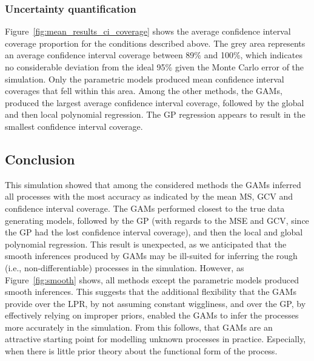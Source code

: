 \documentclass[man, floatsintext]{apa7}
\begin{document}
\subsubsection{Uncertainty quantification}

Figure~\ref{fig:mean_results_ci_coverage} shows the average confidence interval
coverage proportion for the conditions described above. The grey area
represents an average confidence interval coverage between 89\% and 100\%,
which indicates no considerable deviation from the ideal 95\% given the Monte
Carlo error of the simulation. Only the parametric models produced mean
confidence interval coverages that fell within this area. Among the other
methods, the GAMs, produced the largest average confidence interval coverage,
followed by the global and then local polynomial regression. The GP regression
appears to result in the smallest confidence interval coverage.

\begin{sidewaysfigure*}[htbp]
  \caption{Average confidence interval coverage across all processes, analysis
    methods, and simulation conditions}
  \label{fig:mean_results_ci_coverage}
\end{sidewaysfigure*}

\subsection{Conclusion}

This simulation showed that among the considered methods the GAMs inferred all
processes with the most accuracy as indicated by the mean MS, GCV and
confidence interval coverage. The GAMs performed closest to the true data
generating models, followed by the GP (with regards to the MSE and GCV, since
the GP had the lost confidence interval coverage), and then the local and
global polynomial regression. This result is unexpected, as we anticipated that
the smooth inferences produced by GAMs may be ill-suited for inferring the
rough (i.e., non-differentiable) processes in the simulation. However, as
Figure~\ref{fig:smooth} shows, all methods except the parametric models
produced smooth inferences. This suggests that the additional flexibility that
the GAMs provide over the LPR, by not assuming constant wiggliness, and over
the GP, by effectively relying on improper priors, enabled the GAMs to infer
the processes more accurately in the simulation. From this follows, that GAMs
are an attractive starting point for modelling unknown processes in practice.
Especially, when there is little prior theory about the functional form of the
process.
\end{document}
